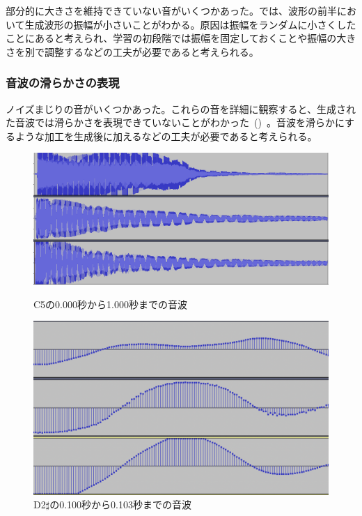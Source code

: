 部分的に大きさを維持できていない音がいくつかあった。では、波形の前半において生成波形の振幅が小さいことがわかる。原因は振幅をランダムに小さくしたことにあると考えられ、学習の初段階では振幅を固定しておくことや振幅の大きさを別で調整するなどの工夫が必要であると考えられる。
    
\subsubsection{音波の滑らかさの表現}

ノイズまじりの音がいくつかあった。これらの音を詳細に観察すると、生成された音波では滑らかさを表現できていないことがわかった~()~。音波を滑らかにするような加工を生成後に加えるなどの工夫が必要であると考えられる。

\begin{figure}[b]
\centering
\begin{minipage}{0.48\columnwidth}
\centering
\includegraphics[width=0.85\columnwidth]{figure/88_88/c5.png}
\caption[C5の音波]{C5の0.000秒から1.000秒までの音波}
\label{fig:88_88_amp}
\end{minipage}
\begin{minipage}{0.48\columnwidth}
\centering
\includegraphics[width=0.75\columnwidth]{figure/88_88_det/d2s_0100_0103.png}
\caption[D2$\sharp$の音波]{D2$\sharp$の0.100秒から0.103秒までの音波}
\label{fig:88_88_smooth}
\end{minipage}
\end{figure}

